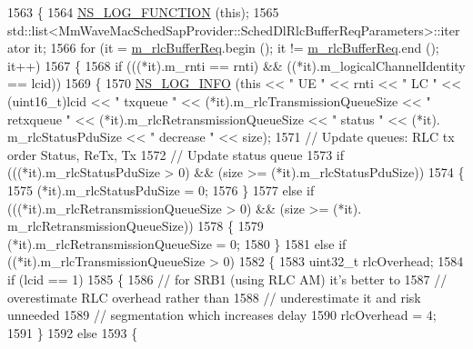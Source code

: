 \begin{DoxyCode}
1563 \{
1564   \hyperlink{log-macros-disabled_8h_a90b90d5bad1f39cb1b64923ea94c0761}{NS\_LOG\_FUNCTION} (\textcolor{keyword}{this});
1565   std::list<MmWaveMacSchedSapProvider::SchedDlRlcBufferReqParameters>::iterator it;
1566   \textcolor{keywordflow}{for} (it = \hyperlink{classns3_1_1MmWaveFlexTtiPfMacScheduler_adc38b71e3ba396af89586e28148853d5}{m\_rlcBufferReq}.begin (); it != \hyperlink{classns3_1_1MmWaveFlexTtiPfMacScheduler_adc38b71e3ba396af89586e28148853d5}{m\_rlcBufferReq}.end (); it++)
1567     \{
1568       \textcolor{keywordflow}{if} (((*it).m\_rnti == rnti) && ((*it).m\_logicalChannelIdentity == lcid))
1569         \{
1570           \hyperlink{group__logging_gafbd73ee2cf9f26b319f49086d8e860fb}{NS\_LOG\_INFO} (\textcolor{keyword}{this} << \textcolor{stringliteral}{" UE "} << rnti << \textcolor{stringliteral}{" LC "} << (uint16\_t)lcid << \textcolor{stringliteral}{" txqueue "} << 
      (*it).m\_rlcTransmissionQueueSize << \textcolor{stringliteral}{" retxqueue "} << (*it).m\_rlcRetransmissionQueueSize << \textcolor{stringliteral}{" status "} << (*it).
      m\_rlcStatusPduSize << \textcolor{stringliteral}{" decrease "} << size);
1571           \textcolor{comment}{// Update queues: RLC tx order Status, ReTx, Tx}
1572           \textcolor{comment}{// Update status queue}
1573            \textcolor{keywordflow}{if} (((*it).m\_rlcStatusPduSize > 0) && (size >= (*it).m\_rlcStatusPduSize))
1574               \{
1575                 (*it).m\_rlcStatusPduSize = 0;
1576               \}
1577             \textcolor{keywordflow}{else} \textcolor{keywordflow}{if} (((*it).m\_rlcRetransmissionQueueSize > 0) && (size >= (*it).
      m\_rlcRetransmissionQueueSize))
1578               \{
1579                 (*it).m\_rlcRetransmissionQueueSize = 0;
1580               \}
1581             \textcolor{keywordflow}{else} \textcolor{keywordflow}{if} ((*it).m\_rlcTransmissionQueueSize > 0)
1582               \{
1583                 uint32\_t rlcOverhead;
1584                 \textcolor{keywordflow}{if} (lcid == 1)
1585                   \{
1586                     \textcolor{comment}{// for SRB1 (using RLC AM) it's better to}
1587                     \textcolor{comment}{// overestimate RLC overhead rather than}
1588                     \textcolor{comment}{// underestimate it and risk unneeded}
1589                     \textcolor{comment}{// segmentation which increases delay}
1590                     rlcOverhead = 4;
1591                   \}
1592                 \textcolor{keywordflow}{else}
1593                   \{

\end{DoxyCode}
